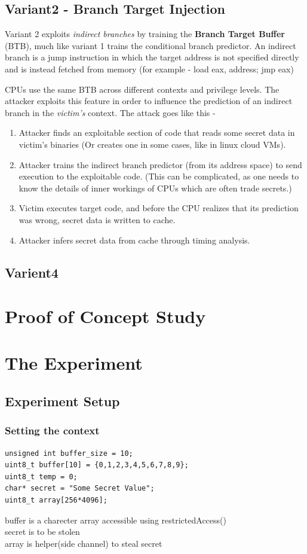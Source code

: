 \documentclass[12pt]{article}
\begin{document}
\subsection{Variant2 - Branch Target Injection}
Variant 2 exploits \textit{indirect branches} by training the \textbf{Branch Target Buffer} (BTB), much like variant 1 trains the conditional branch predictor. An indirect branch is a jump instruction in which the target address is not specified directly and is instead fetched from memory (for example - load eax, address; jmp eax)

CPUs use the same BTB across different contexts and privilege levels. The attacker exploits this feature in order to influence the prediction of an indirect branch in the \textit{victim's} context. The attack goes like this - 
 \begin{enumerate}
 \item Attacker finds an exploitable section of code that reads some secret data in victim's binaries (Or creates one in some cases, like in linux cloud VMs).
 \item Attacker trains the indirect branch predictor (from its address space) to send execution to the exploitable code. (This can be complicated, as one needs to know the details of inner workings of CPUs which are often trade secrets.)
 \item Victim executes target code, and before the CPU realizes that its prediction was wrong, secret data is written to cache.
 \item Attacker infers secret data from cache through timing analysis.
 \end{enumerate}
\subsection{Varient4}
\section{Proof of Concept Study}
\section{The Experiment\cite{SeedLabs}}
\subsection{Experiment Setup}
\subsubsection{Setting the context}
\begin{lstlisting}[style=CStyle]
unsigned int buffer_size = 10;
uint8_t buffer[10] = {0,1,2,3,4,5,6,7,8,9};
uint8_t temp = 0;
char* secret = "Some Secret Value";
uint8_t array[256*4096];
\end{lstlisting}
buffer is a charecter array accessible using restrictedAccess()\\
secret is to be stolen\\
array is helper(side channel) to steal secret  
\end{document}
